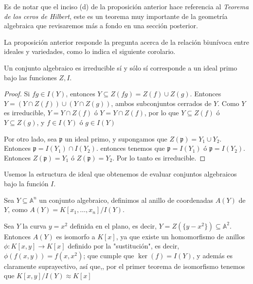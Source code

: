 Es de notar que el inciso (d) de la proposición anterior hace referencia al \emph{Teorema de los ceros de Hilbert}, este es un teorema muy importante de la geometría algebraica que revisaremos más a fondo en una sección posterior. 

La proposición anterior responde la pregunta acerca de la relación biunívoca entre ideales y variedades, como lo indica el siguiente corolario. 

\begin{corollary}
Un conjunto algebraico es irreducible sí y sólo sí corresponde a un ideal primo bajo las funciones $Z, I$.
\end{corollary}

\begin{proof}
Si $fg \in I(Y)$, entonces $Y \subseteq Z(fg) = Z(f)\cup Z(g)$. Entonces $Y = (Y \cap Z(f)) \cup (Y \cap Z(g))$, ambos subconjuntos cerrados de $Y$. Como $Y$ es irreducible, $Y = Y \cap Z(f)$ ó $Y = Y \cap Z(f)$, por lo que $Y \subseteq Z(f)$ ó $Y \subseteq Z(g)$, y $f \in I(Y)$ ó $g \in I(Y)$

Por otro lado, sea $\mathfrak{p}$ un ideal primo, y supongamos que $Z(\mathfrak{p}) = Y_1 \cup Y_2$. Entonces $\mathfrak{p} = I(Y_1)\cap I(Y_2)$. entonces tenemos que $\mathfrak{p} = I(Y_1)$ ó $\mathfrak{p} = I(Y_2)$. Entonces $Z(\mathfrak{p}) = Y_1$ ó $Z(\mathfrak{p}) = Y_2$. Por lo tanto es irreducible.
\end{proof}

Usemos la estructura de ideal que obtenemos de evaluar conjuntos algebraicos bajo la función $I$.

\begin{definition}
Sea $Y \subseteq \mathbb{A}^n$ un conjunto algebraico, definimos al anillo de coordenadas $A(Y)$ de $Y$, como $A(Y) = K[x_1, \dots, x_n]/I(Y)$.
\end{definition}

\begin{example}
Sea $Y$ la curva $y = x^2$ definida en el plano, es decir, $Y = Z(\{y - x^2\}) \subseteq \mathbb{A}^2$. Entonces $A(Y)$ es isomorfo a $K[x]$, ya que existe un homomorfismo de anillos $\phi:K[x, y] \rightarrow K[x]$ definido por la "sustitución", es decir, $\phi(f(x, y)) = f(x, x^2)$; que cumple que $\ker(f) = I(Y)$, y además es claramente suprayectivo, así que,, por el primer teorema de isomorfismo tenemos que $K[x,y]/I(Y) \approx K[x]$
\end{example}